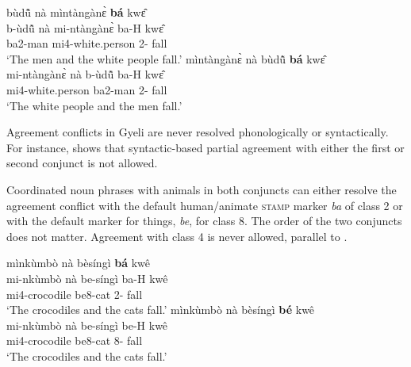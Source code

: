 \ea \label{resol1}
  \ea  \label{resol1a}
  \glll  bùdũ̂ nà mìntàngànɛ̀ {\bfseries bá} kwɛ̂\\
  b-ùdũ̂ nà mi-ntàngànɛ̀ ba-H kwɛ̂ \\
    ba2-man {\COM} mi4-white.person 2-{\PRS} fall\\
    \trans `The men and the white people fall.'
  \ex  \label{resol1b}
\glll  mìntàngànɛ̀ nà bùdũ̂ {\bfseries bá} kwɛ̂\\
  mi-ntàngànɛ̀ nà b-ùdũ̂ ba-H kwɛ̂ \\
    mi4-white.person {\COM} ba2-man 2-{\PRS} fall\\
    \trans `The white people and the men fall.'
\z
\z

Agreement conflicts in Gyeli are never resolved phonologically or syntactically. For instance,  shows that syntactic-based partial agreement with either the first or second conjunct is not allowed. 

\ea \label{resol1x}
\z
\z

Coordinated noun phrases with animals in both conjuncts can either resolve the agreement conflict with the default human/animate \textsc{stamp} marker {\itshape ba} of class 2 or with the default marker for things, {\itshape be}, for class 8. The order of the two conjuncts does not matter. Agreement with class 4 is never allowed, parallel to .

\ea \label{resol2}
  \ea  \label{resol2a}
  \glll mìnkùmbò nà bèsíngì {\bfseries bá} kwê\\
  mi-nkùmbò nà be-síngì ba-H kwê\\
  mi4-crocodile {\COM} be8-cat 2-{\PRS} fall\\
  \trans `The crocodiles and the cats fall.' 
 \ex  \label{resol2b}
  \glll mìnkùmbò nà bèsíngì {\bfseries bé} kwê\\  
  mi-nkùmbò nà be-síngì be-H kwê\\
  mi4-crocodile {\COM} be8-cat 8-{\PRS} fall\\
  \trans `The crocodiles and the cats fall.' 
\z
\z






